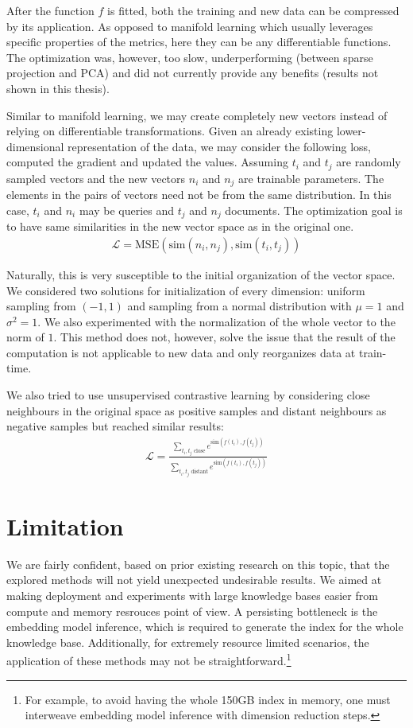 After the function $f$ is fitted, both the training and new data can be compressed by its application.
As opposed to manifold learning which usually leverages specific properties of the metrics, here they can be any differentiable functions.
The optimization was, however, too slow, underperforming (between sparse projection and PCA) and did not currently provide any benefits (results not shown in this thesis).

Similar to manifold learning, we may create completely new vectors instead of relying on differentiable transformations.
Given an already existing lower-dimensional representation of the data, we may consider the following loss, computed the gradient and updated the values.
Assuming $t_i$ and $t_j$ are randomly sampled vectors and the new vectors $n_i$ and $n_j$ are trainable parameters.
The elements in the pairs of vectors need not be from the same distribution. In this case, $t_i$ and $n_i$ may be queries and $t_j$ and $n_j$ documents.
The optimization goal is to have same similarities in the new vector space as in the original one.
\begin{gather*}
    \mathcal{L} = \text{MSE}(\text{sim}(n_i, n_j), \text{sim}(t_i, t_j))
\end{gather*}
    
Naturally, this is very susceptible to the initial organization of the vector space. We considered two solutions for initialization of every dimension: uniform sampling from $(-1,1)$ and sampling from a normal distribution with $\mu = 1$ and $\sigma^2 = 1$.
We also experimented with the normalization of the whole vector to the norm of $1$.
This method does not, however, solve the issue that the result of the computation is not applicable to new data and only reorganizes data at train-time.

We also tried to use unsupervised contrastive learning by considering close neighbours in the original space as positive samples and distant neighbours as negative samples but reached similar results:
\begin{gather*}
    \mathcal{L}= \frac{\sum_{t_i, t_j \text{ close}} e^{\text{sim}(f(t_i), f(t_j))}}{\sum_{t_i, t_j \text{ distant}} e^{\text{sim}(f(t_i), f(t_j))}}
\end{gather*}

\section{Limitation}

We are fairly confident, based on prior existing research on this topic, that the explored methods will not yield unexpected undesirable results.
We aimed at making deployment and experiments with large knowledge bases easier from compute and memory resrouces point of view.
A persisting bottleneck is the embedding model inference, which is required to generate the index for the whole knowledge base.
Additionally, for extremely resource limited scenarios, the application of these methods may not be straightforward.\footnote{For example, to avoid having the whole 150GB index in memory, one must interweave embedding model inference with dimension reduction steps.}

